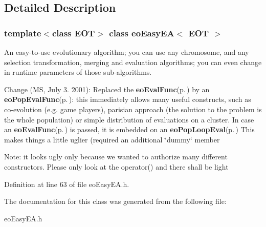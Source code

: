 \subsection{Detailed Description}
\subsubsection*{template$<$class EOT$>$ class eo\-Easy\-EA$<$ EOT $>$}

An easy-to-use evolutionary algorithm; you can use any chromosome, and any selection transformation, merging and evaluation algorithms; you can even change in runtime parameters of those sub-algorithms. 

Change (MS, July 3. 2001): Replaced the {\bf eo\-Eval\-Func}{\rm (p.\,\pageref{classeo_eval_func})} by an {\bf eo\-Pop\-Eval\-Func}{\rm (p.\,\pageref{classeo_pop_eval_func})}: this immediately allows many useful constructs, such as co-evolution (e.g. game players), parisian approach (the solution to the problem is the whole population) or simple distribution of evaluations on a cluster. In case an {\bf eo\-Eval\-Func}{\rm (p.\,\pageref{classeo_eval_func})} is passed, it is embedded on an {\bf eo\-Pop\-Loop\-Eval}{\rm (p.\,\pageref{classeo_pop_loop_eval})} This makes things a little uglier (required an additional \char`\"{}dummy\char`\"{} member

Note: it looks ugly only because we wanted to authorize many different constructors. Please only look at the operator() and there shall be light 



Definition at line 63 of file eo\-Easy\-EA.h.

The documentation for this class was generated from the following file:\begin{CompactItemize}
\item 
eo\-Easy\-EA.h\end{CompactItemize}
